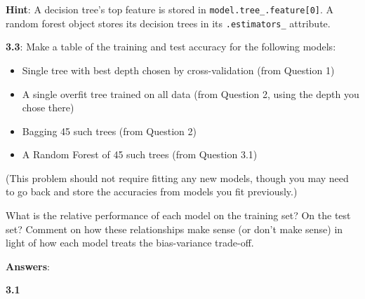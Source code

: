 \documentclass[11pt]{article}
\providecommand{\tightlist}{%
      \setlength{\itemsep}{0pt}\setlength{\parskip}{0pt}}
\begin{document}
\textbf{Hint}: A decision tree's top feature is stored in
\texttt{model.tree\_.feature{[}0{]}}. A random forest object stores its
decision trees in its \texttt{.estimators\_} attribute.

\textbf{3.3}: Make a table of the training and test accuracy for the
following models:

\begin{itemize}
\tightlist
\item
  Single tree with best depth chosen by cross-validation (from Question
  1)
\item
  A single overfit tree trained on all data (from Question 2, using the
  depth you chose there)
\item
  Bagging 45 such trees (from Question 2)
\item
  A Random Forest of 45 such trees (from Question 3.1)
\end{itemize}

(This problem should not require fitting any new models, though you may
need to go back and store the accuracies from models you fit
previously.)

What is the relative performance of each model on the training set? On
the test set? Comment on how these relationships make sense (or don't
make sense) in light of how each model treats the bias-variance
trade-off.

    \textbf{Answers}:

    \textbf{3.1}
\end{document}
